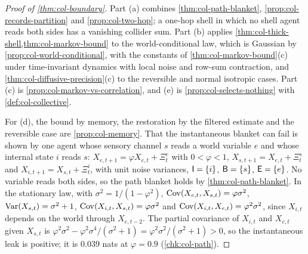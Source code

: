 \begin{proof}[Proof of \cref{thm:col-boundary}]
Part (a) combines \cref{thm:col-path-blanket}, \cref{prop:col-records-partition} and \cref{prop:col-two-hop}; a one-hop shell in which no shell agent reads both sides has a vanishing collider sum. Part (b) applies \cref{thm:col-thick-shell,thm:col-markov-bound} to the world-conditional law, which is Gaussian by \cref{prop:col-world-conditional}, with the constants of \cref{thm:col-markov-bound}(c) under time-invariant dynamics with local noise and row-sum contraction, and \cref{thm:col-diffusive-precision}(c) to the reversible and normal isotropic cases. Part (c) is \cref{prop:col-markov-vs-correlation}, and (e) is \cref{prop:col-selects-nothing} with \cref{def:col-collective}.

For (d), the bound by memory, the restoration by the filtered estimate and the reversible case are \cref{prop:col-memory}. That the instantaneous blanket can fail is shown by one agent whose sensory channel $s$ reads a world variable $e$ and whose internal state $i$ reads $s$: $X_{e,t+1}=\varphi X_{e,t}+\Xi^e_t$ with $0<\varphi<1$, $X_{s,t+1}=X_{e,t}+\Xi^s_t$ and $X_{i,t+1}=X_{s,t}+\Xi^i_t$, with unit noise variances, $\mathsf{I}=\{i\}$, $\mathsf{B}=\{s\}$, $\mathsf{E}=\{e\}$. No variable reads both sides, so the path blanket holds by \cref{thm:col-path-blanket}. In the stationary law, with $\sigma^2=1/(1-\varphi^2)$, $\operatorname{Cov}(X_{e,t},X_{s,t})=\varphi\sigma^2$, $\operatorname{Var}(X_{s,t})=\sigma^2+1$, $\operatorname{Cov}(X_{i,t},X_{s,t})=\varphi\sigma^2$ and $\operatorname{Cov}(X_{i,t},X_{e,t})=\varphi^2\sigma^2$, since $X_{i,t}$ depends on the world through $X_{e,t-2}$. The partial covariance of $X_{i,t}$ and $X_{e,t}$ given $X_{s,t}$ is $\varphi^2\sigma^2-\varphi^2\sigma^4/(\sigma^2+1)=\varphi^2\sigma^2/(\sigma^2+1)>0$, so the instantaneous leak is positive; it is $0.039$ nats at $\varphi=0.9$ (\cref{chk:col-path}).
\end{proof}
